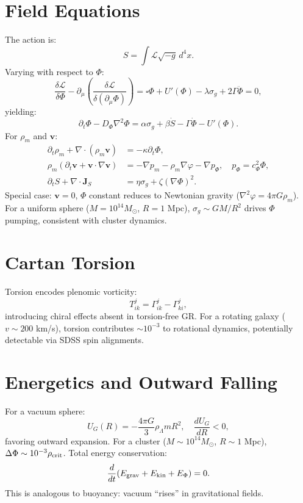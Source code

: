 \documentclass[11pt]{article}
\theoremstyle{plain}
\theoremstyle{definition}
\begin{document}
\section{Field Equations}
\label{sec:field_equations}
The action is:
\begin{equation}
S = \int \mathcal{L} \sqrt{-g} \, d^4x.
\end{equation}
Varying with respect to $\Phi$:
\[
\frac{\delta \mathcal{L}}{\delta \Phi} - \partial_\mu \left( \frac{\delta \mathcal{L}}{\delta (\partial_\mu \Phi)} \right) = \square \Phi + U'(\Phi) - \lambda \sigma_g + 2\Gamma \ddot{\Phi} = 0,
\]
yielding:
\begin{equation}
\partial_t \Phi - D_\Phi \nabla^2 \Phi = \alpha \sigma_g + \beta \dot{S} - \Gamma \dot{\Phi} - U'(\Phi).
\label{eq:phi-eq}
\end{equation}
For $\rho_m$ and $\bm{v}$:
\begin{align}
\partial_t \rho_m + \nabla \cdot (\rho_m \bm{v}) &= -\kappa \partial_t \Phi, \label{eq:budget} \\
\rho_m (\partial_t \bm{v} + \bm{v} \cdot \nabla \bm{v}) &= -\nabla p_m - \rho_m \nabla \varphi - \nabla p_\Phi, \quad p_\Phi = c_\Phi^2 \Phi, \label{eq:mom} \\
\partial_t S + \nabla \cdot \bm{J}_S &= \eta \sigma_g + \zeta (\nabla \Phi)^2. \label{eq:entropy}
\end{align}
Special case: $\bm{v} = 0$, $\Phi$ constant reduces to Newtonian gravity ($\nabla^2 \varphi = 4\pi G \rho_m$). For a uniform sphere ($M = 10^{14} M_\odot$, $R = 1$ Mpc), $\sigma_g \sim GM/R^2$ drives $\Phi$ pumping, consistent with cluster dynamics.

\section{Cartan Torsion}
\label{sec:torsion}
Torsion encodes plenomic vorticity:
\begin{equation}
T^j_{ik} = \Gamma^j_{ik} - \Gamma^j_{ki},
\end{equation}
introducing chiral effects absent in torsion-free GR. For a rotating galaxy ($v \sim 200$ km/s), torsion contributes $\sim 10^{-3}$ to rotational dynamics, potentially detectable via SDSS spin alignments.

\section{Energetics and Outward Falling}
\label{sec:energetics}
For a vacuum sphere:
\begin{equation}
U_G(R) = -\frac{4\pi G}{3} \rho_\Lambda m R^2, \quad \frac{dU_G}{dR} < 0,
\end{equation}
favoring outward expansion. For a cluster ($M \sim 10^{14} M_\odot$, $R \sim 1$ Mpc), $\Delta \Phi \sim 10^{-3} \rho_{\rm crit}$. Total energy conservation:
\begin{equation}
\frac{d}{dt} (E_{\rm grav} + E_{\rm kin} + E_\Phi) = 0.
\end{equation}
This is analogous to buoyancy: vacuum “rises” in gravitational fields.
\end{document}
